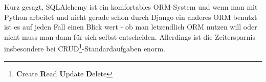 Kurz gesagt, SQLAlchemy ist ein komfortables ORM-System und wenn man mit Python
arbeitet und nicht gerade schon durch Django ein anderes ORM benutzt ist es auf
jeden Fall einen Blick wert - ob man letzendlich ORM nutzen will oder nicht muss
man dann für sich selbst entscheiden. Allerdings ist die Zeitersparnis
insbesondere bei CRUD\footnote{\textbf{C}reate \textbf{R}ead \textbf{U}pdate
\textbf{D}elete}-Standardaufgaben enorm.
